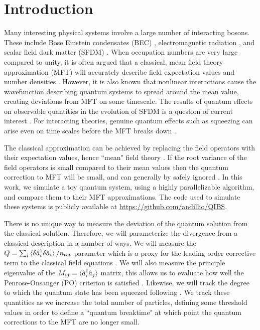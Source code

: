 \documentclass[aps,prd,twocolumn,superscriptaddress]{revtex4-1}
\begin{document}
\section{Introduction} \label{sec:Intro}

Many interesting physical systems involve a large number of interacting bosons. These include Bose Einstein condensates (BEC) \cite{Gross, Leggett2001,Anderson1995, Davis1995}, electromagnetic radiation \cite{bial1977}, and scalar field dark matter (SFDM) \cite{Hu2000, Mocz2019, guth2015, chakrabarty2021}. When occupation numbers are very large compared to unity, it is often argued that a classical, mean field theory approximation (MFT) will accurately describe field expectation values and number densities \cite{Hu2000, Mocz2019, guth2015, bial1977, Gross, Leggett2001, Hertzberg2016, Minguzzi2004, Lieb2002}. However, it is also known that nonlinear interactions cause the wavefunction describing quantum systems to spread around the mean value, creating deviations from MFT on some timescale. The results of quantum effects on observable quantities in the evolution of SFDM is a question of current interest \cite{Sikivie2017, Hertzberg2016, KoppFragkosPikovski2021, Chakrabarty:2017fkd, chakrabarty2021, Lisanti, Lentz2019, Lentz2020}. 
For interacting theories, genuine quantum effects such as squeezing can arise even on time scales before the MFT breaks down \cite{TanasKielich1983, ParkinsWalls1998, JohnssonHaine2007,  KoppFragkosPikovski2021}. 

The classical approximation can be achieved by replacing the field operators with their expectation values, hence ``mean" field theory \cite{Ball}. If the root variance of the field operators is small compared to their mean values then the quantum correction to MFT will be small, and can generally by safely ignored \cite{Eberhardt2021}. In this work, we simulate a toy quantum system, using a highly parallelizable algorithm, and compare them to their MFT approximations. The code used to simulate these systems is publicly available at \href{https://github.com/andillio/QIBS}{https://github.com/andillio/QIBS}.

There is no unique way to measure the deviation of the quantum solution from the classical solution. Therefore, we will parameterize the divergence from a classical description in a number of ways. We will measure the $Q = \sum_i \braket{\delta \hat a_i^\dagger \delta \hat a_i}/n_{tot}$ parameter which is a proxy for the leading order corrective term to the classical field equations \cite{Eberhardt2021}. We will also measure the principle eigenvalue of the $M_{ij} = \braket{\hat a_i^\dagger \hat a_j}$ matrix, this allows us to evaluate how well the Penrose-Onsanger (PO) criterion is satisfied \cite{Penrose1956}. Likewise, we will track the degree to which the quantum state has been squeezed following \cite{KoppFragkosPikovski2021}. We track these quantities as we increase the total number of particles, defining some threshold values in order to define a ``quantum breaktime" at which point the quantum corrections to the MFT are no longer small. 
\end{document}
